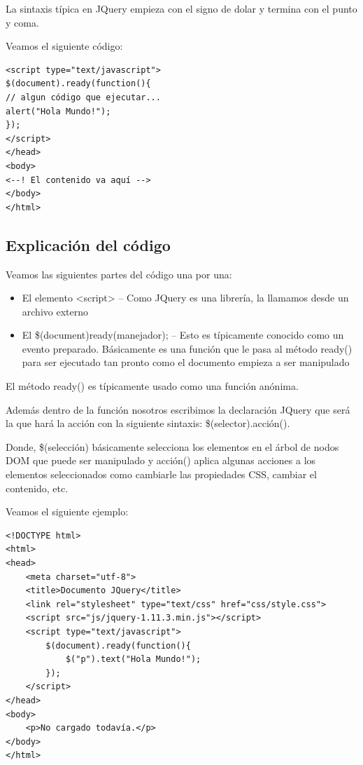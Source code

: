 \documentclass[a4paper, oneside]{article}
\begin{document}
La sintaxis típica en JQuery empieza con el signo de dolar y termina con el punto y coma. 

Veamos el siguiente código:

\begin{verbatim}
<script type="text/javascript">
$(document).ready(function(){
// algun código que ejecutar...
alert("Hola Mundo!");
});
</script>
</head>
<body>
<--! El contenido va aquí -->
</body>
</html>
\end{verbatim}

\subsection{Explicación del código}
\label{sec:org37e65d0}

Veamos las siguientes partes del código una por una:

\begin{itemize}
\item El elemento <script> -- Como JQuery es una librería, la llamamos desde un archivo externo
\item El \$(document)ready(manejador); -- Esto es típicamente conocido como un evento preparado. Básicamente es una función que le pasa al método ready() para ser ejecutado tan pronto como el documento empieza a ser manipulado
\end{itemize}

El método ready() es típicamente usado como una función anónima. 

Además dentro de la función nosotros escribimos la declaración JQuery que será la que hará la acción con la siguiente sintaxis: \$(selector).acción().

Donde, \$(selección) básicamente selecciona los elementos en el árbol de nodos DOM que puede ser manipulado y acción() aplica algunas acciones a los elementos seleccionados como cambiarle las propiedades CSS, cambiar el contenido, etc. 

Veamos el siguiente ejemplo:

\begin{verbatim}
<!DOCTYPE html>
<html>
<head>
    <meta charset="utf-8">
    <title>Documento JQuery</title>
    <link rel="stylesheet" type="text/css" href="css/style.css">
    <script src="js/jquery-1.11.3.min.js"></script>
    <script type="text/javascript">
        $(document).ready(function(){
            $("p").text("Hola Mundo!");
        });
    </script>
</head>
<body>
    <p>No cargado todavía.</p>
</body>
</html>
\end{verbatim}
\end{document}
